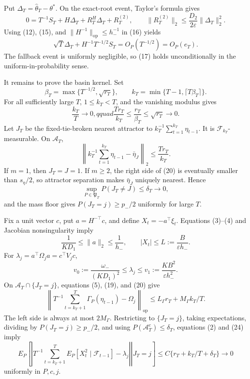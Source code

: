 Put \(\Delta_T=\widehat\theta_T-\theta^*\).  On the exact-root event, Taylor's formula gives
\[
 0=T^{-1}S_T+H\Delta_T+R_T^H\Delta_T+R_T^{(2)},
 \qquad \|R_T^{(2)}\|_2\le\frac{D_2}{2\varepsilon}\|\Delta_T\|_2^2.
\tag{16}
\]
Using (12), (15), and \(\|H^{-1}\|_{\mathrm{op}}\le h_-^{-1}\) in (16) yields
\[
 \sqrt T\Delta_T+H^{-1}T^{-1/2}S_T
 =O_P(T^{-1/2})=O_P(e_T).
\tag{17}
\]
The fallback event is uniformly negligible, so (17) holds unconditionally in the uniform-in-probability sense.

It remains to prove the basin kernel.  Set
\[
 \beta_T=\max\{T^{-1/2},\sqrt{r_T}\},\qquad
 k_T=\min\{T-1,\lceil T\beta_T\rceil\}.
\tag{18}
\]
For all sufficiently large \(T\), \(1\le k_T<T\), and the vanishing modulus gives
\[
 \frac{k_T}{T}\longrightarrow0,qquad
 \frac{Tr_T}{k_T}\le\frac{r_T}{\beta_T}
 \le\sqrt{r_T}\longrightarrow0.
\tag{19}
\]
Let \(J_T\) be the fixed-tie-broken nearest attractor to \(k_T^{-1}\sum_{t=1}^{k_T}\eta_{t-1}\).  It is \(\mathcal F_{k_T}\)-measurable.  On \(\mathcal A_T\),
\[
 \left\|k_T^{-1}\sum_{t=1}^{k_T}\eta_{t-1}-\bar\eta_J\right\|_2
 \le\frac{Tr_T}{k_T}.
\tag{20}
\]
If \(m=1\), then \(J_T=J=1\).  If \(m\ge2\), the right side of (20) is eventually smaller than \(s_\eta/2\), so attractor separation makes \(\bar\eta_J\) uniquely nearest.  Hence
\[
 \sup_{P\in\mathfrak P_T}P(J_T\ne J)\le\delta_T\longrightarrow0,
\tag{21}
\]
and the mass floor gives \(P(J_T=j)\ge p_-/2\) uniformly for large \(T\).

Fix a unit vector \(c\), put \(a=H^{-\top}c\), and define \(X_t=-a^\top\xi_t\).  Equations (3)--(4) and Jacobian nonsingularity imply
\[
 \frac1{KD_1}\le\|a\|_2\le\frac1{h_-},
 \qquad |X_t|\le L:=\frac{B}{\varepsilon h_-}.
\tag{22}
\]
For \(\lambda_j=a^\top\Omega_ja=c^\top V_jc\),
\[
 v_0:=\frac{\omega_-}{(KD_1)^2}\le\lambda_j
 \le v_1:=\frac{KB^2}{\varepsilon h_-^2}.
\tag{23}
\]
On \(\mathcal A_T\cap\{J_T=j\}\), equations (5), (19), and (20) give
\[
 \left\|T^{-1}\sum_{t=k_T+1}^T\Gamma_P(\eta_{t-1})-
 \Omega_j\right\|_{\mathrm{op}}
 \le L_\Gamma r_T+M_\Gamma k_T/T.
\tag{24}
\]
The left side is always at most \(2M_\Gamma\).  Restricting to \(\{J_T=j\}\), taking expectations, dividing by \(P(J_T=j)\ge p_-/2\), and using \(P(\mathcal A_T^c)\le\delta_T\), equations (2) and (24) imply
\[
 E_P\!\left[\left.\left|T^{-1}\sum_{t=k_T+1}^T
 E_P[X_t^2\mid\mathcal F_{t-1}]-\lambda_j\right|
 \right|J_T=j\right]
 \le C\{r_T+k_T/T+\delta_T\}\longrightarrow0
\tag{25}
\]
uniformly in \(P,c,j\).

